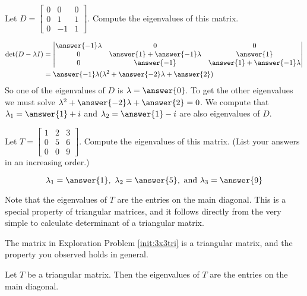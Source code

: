 \documentclass{ximera}
\begin{document}
\begin{example}\label{ex:3x3_complex_eig}
Let $D=\begin{bmatrix} 0&0&0\\ 0 &1&1\\ 0 & -1&1\end{bmatrix}$.  Compute the eigenvalues of this matrix.
    
\begin{explanation}
    \begin{align*}
    \det(D-\lambda I) &= \begin{vmatrix} 
    \answer{-1}\lambda & 0 & 0\\ 
    0 & \answer{1}+\answer{-1}\lambda & \answer{1}\\ 
    0 & \answer{-1} & \answer{1}+\answer{-1}\lambda 
    \end{vmatrix} \\
    &= \answer{-1}\lambda(\lambda^2 + \answer{-2}\lambda + \answer{2})
    \end{align*}
    So one of the eigenvalues of $D$ is $\lambda=\answer{0}$.  To get the other eigenvalues we must solve $\lambda^2+\answer{-2}\lambda+\answer{2}=0$.  We compute that $\lambda_1=\answer{1}+i$ and $\lambda_2=\answer{1}-i$ are also eigenvalues of $D$.
    \end{explanation}
\end{example}


    
\begin{exploration}\label{init:3x3tri}
Let $T=\begin{bmatrix} 1 & 2 & 3\\ 0 & 5 & 6\\ 0 & 0 & 9\end{bmatrix}$.  Compute the eigenvalues of this matrix.  (List your answers in an increasing order.)
    
$$\lambda_1=\answer{1},\quad\lambda_2=\answer{5},\quad\text{and}\quad\lambda_3=\answer{9}$$
    
Note that the eigenvalues of $T$ are the entries on the main diagonal. This is a special property of triangular matrices, and it follows directly from the very simple to calculate determinant of a triangular matrix.
\end{exploration}
    
The matrix in Exploration Problem \ref{init:3x3tri} is a triangular matrix, and the property you observed holds in general.
    
\begin{theorem}\label{th:eigtri}
Let $T$ be a triangular matrix.  Then the eigenvalues of $T$ are the entries on the main diagonal.
\end{theorem}
    
\end{document}
